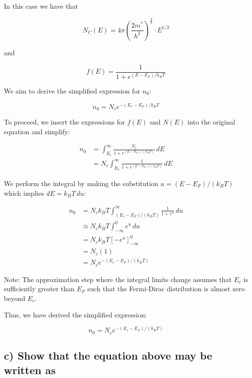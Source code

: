 In this case we have that

\begin{equation*}
    N_{C}(E)=4 \pi\left(\frac{2 m^{*}}{h^{2}}\right)^{\frac{3}{2}} \cdot E^{1 / 2}
\end{equation*}

and

\begin{equation*}
    f(E)=\frac{1}{1+e^{\left(E-E_{F}\right) / k_{B} T}}
\end{equation*}

We aim to derive the simplified expression for $ n_0 $:

\begin{equation*}
n_{0} = N_c e^{-(E_{c} - E_{F}) / k_B T}
\end{equation*}

To proceed, we insert the expressions for $ f(E) $ and $ N(E) $ into the original equation and simplify:

\begin{align*}
n_0 &= \int_{E_c}^{\infty} \frac{N_c}{1 + e^{(E - E_F) / (k_B T)}} \, dE \\
&= N_c \int_{E_c}^{\infty} \frac{1}{1 + e^{(E - E_F) / (k_B T)}} \, dE
\end{align*}

We perform the integral by making the substitution $ u = (E - E_F) / (k_B T) $ which implies $ dE = k_B T \, du $:

\begin{align*}
n_0 &= N_c k_B T \int_{(E_c - E_F)/(k_B T)}^{\infty} \frac{1}{1 + e^u} \, du \\
&\approx N_c k_B T \int_{-\infty}^{0} e^u \, du \\
&= N_c k_B T [-e^u]_{-\infty}^0 \\
&= N_c (1) \\
&= N_c e^{-(E_c - E_F) / (k_B T)}
\end{align*}

Note: The approximation step where the integral limits change assumes that $ E_c $ is sufficiently greater than $ E_F $ such that the Fermi-Dirac distribution is almost zero beyond $ E_c $.

Thus, we have derived the simplified expression:

\begin{equation*}
n_0 = N_c e^{-(E_c - E_F) / (k_B T)}
\end{equation*}

\subsection*{c) Show that the equation above may be written as}

